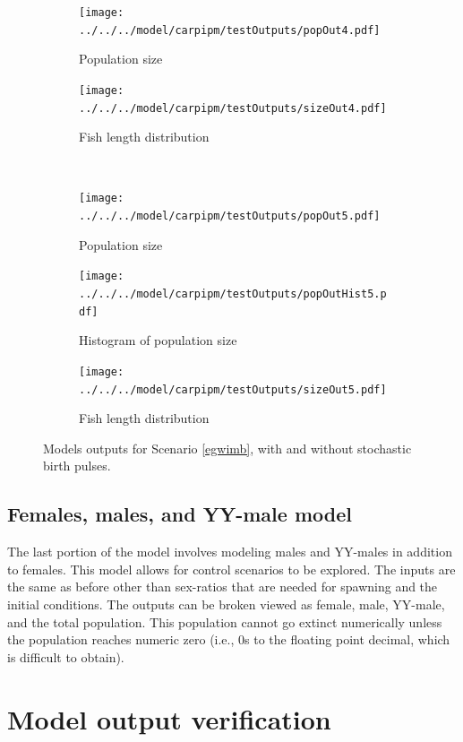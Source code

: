 \documentclass{article}[12pt]
\begin{document}
\begin{figure}[htbp]
	\centering
	\begin{subfigure}[b]{0.4\textwidth}
		\texttt{[image: ../../../model/carpipm/testOutputs/popOut4.pdf]} 
		\caption{Population size} 
		\label{fig:pop4}
	\end{subfigure}
	\qquad
	\begin{subfigure}[b]{0.4\textwidth}
		\texttt{[image: ../../../model/carpipm/testOutputs/sizeOut4.pdf]} 
		\caption{Fish length distribution} 
		\label{fig:size4}
	\end{subfigure}
	\qquad\\
	\begin{subfigure}[b]{0.4\textwidth}
		\texttt{[image: ../../../model/carpipm/testOutputs/popOut5.pdf]} 
		\caption{Population size} 
		\label{fig:pop5}
	\end{subfigure}
	\qquad
	\begin{subfigure}[b]{0.4\textwidth}
		\texttt{[image: ../../../model/carpipm/testOutputs/popOutHist5.pdf]} 
		\caption{Histogram of population size} 
		\label{fig:popHist5}
	\end{subfigure}
	\qquad
	\begin{subfigure}[b]{0.4\textwidth}
		\texttt{[image: ../../../model/carpipm/testOutputs/sizeOut5.pdf]} 
		\caption{Fish length distribution} 
		\label{fig:size5}
	\end{subfigure}
   \caption{Models outputs for Scenario \ref{egwimb}, with and without stochastic birth pulses.}
   \label{fig:scn3out}
\end{figure}


\subsection{Females, males, and YY-male model}\label{fmYYm}

The last portion of the model involves modeling males and YY-males in addition to females.
This model allows for control scenarios to be explored. 
The inputs are the same as before other than sex-ratios that are needed for spawning and the initial conditions. 
The outputs can be broken viewed as female, male, YY-male, and the total population.
This population cannot go extinct numerically unless the population reaches numeric zero (i.e., 0s to the floating point decimal, which is difficult to obtain).  


\section{Model output verification}
\end{document}
